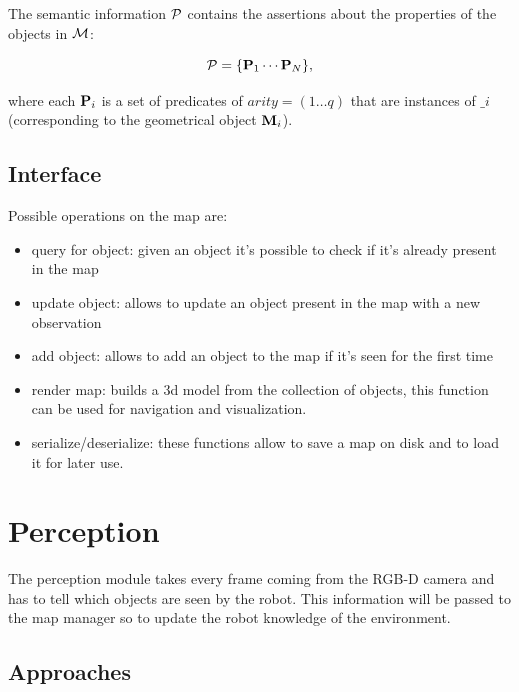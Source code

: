 \documentclass{article}
\begin{document}
	The semantic information $\mathcal{P}$ contains the assertions about the properties of the objects in $\mathcal{M}$:
	
	\begin{equation}
	\mathcal{P} = \{\mathbf{P}_1 \cdots \mathbf{P}_N\},
	\end{equation}
	
	\noindent
	where each $\mathbf{P}_i$ is a set of predicates of $arity = (1 \dots q)$ that are instances of $\bm_i$ (corresponding to the geometrical object $\mathbf{M}_i$).
	
	\subsection{Interface}
	
	Possible operations on the map are:
	
	\begin{itemize}
		\item query for object: given an object it's possible to check if it's already present in the map
		\item update object: allows to update an object present in the map with a new observation
		\item add object: allows to add an object to the map if it's seen for the first time
		\item render map: builds a 3d model from the collection of objects, this function can be used for navigation and visualization.
		\item serialize/deserialize: these functions allow to save a map on disk and to load it for later use.
	\end{itemize}
	
	
	\section{Perception}
	
	The perception module takes every frame coming from the RGB-D camera and has to tell which objects are seen by the robot. This information will be passed to the map manager so to update the robot knowledge of the environment.
	
	\subsection{Approaches}
	
\end{document}

